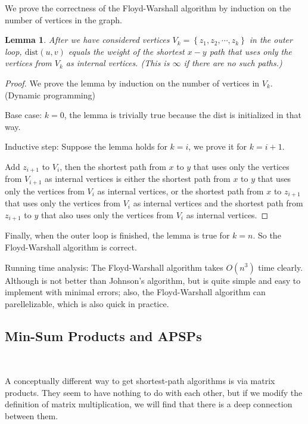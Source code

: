 \documentclass[11pt]{article}
\theoremstyle{plain}
\newtheorem{lemma}{Lemma}[section]
\begin{document}
We prove the correctness of the Floyd-Warshall algorithm by induction on the number of vertices in the graph.

\begin{lemma}
  After we have considered vertices $V_k = \left\{ z_1, z_2, \cdots, z_k \right\} $ in the outer loop, 
  $\text{dist}(u, v)$ equals the weight of the shortest $x-y$ path that uses
  only the vertices from $V_k$ as internal vertices. (This is $\infty$ if there are no such
  paths.)
\end{lemma}

\begin{proof}
  We prove the lemma by induction on the number of vertices in $V_k$. (Dynamic programming)

  Base case: $k = 0$, the lemma is trivially true because the dist is initialized in that way.

  Inductive step: Suppose the lemma holds for $k = i$, we prove it for $k = i + 1$.

  Add $z_{i+1}$ to $V_i$, then the shortest path from $x$ to $y$ that uses only the vertices from $V_{i+1}$ as internal vertices
  is either the shortest path from $x$ to $y$ that uses only the vertices from $V_i$ as internal vertices, or the shortest path from $x$ to $z_{i+1}$
  that uses only the vertices from $V_i$ as internal vertices and the shortest path from $z_{i+1}$ to $y$ that also uses only the vertices from $V_i$ as internal vertices.

\end{proof}

Finally, when the outer loop is finished, the lemma is true for $k = n$. So the Floyd-Warshall algorithm is correct.

Running time analysis: The Floyd-Warshall algorithm takes $O(n^{3})$ time clearly. Although is not better than 
Johnson's algorithm, but is quite simple and easy to implement with minimal errors; also, the 
Floyd-Warshall algorithm can parellelizable, which is also quick in practice.

\subsection{Min-Sum Products and APSPs}\

A conceptually different way to get shortest-path algorithms is via matrix products. 
They seem to have nothing to do with each other, but if we modify the definition of 
matrix multiplication, we will find that there is a deep connection between them.
\end{document}
